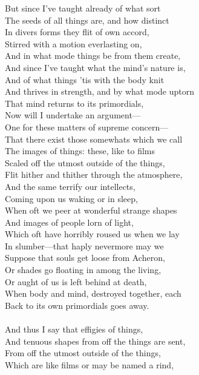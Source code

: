 
But since I've taught already of what sort\\
The seeds of all things are, and how distinct\\
In divers forms they flit of own accord,\\
Stirred with a motion everlasting on,\\
And in what mode things be from them create,\\
And since I've taught what the mind's nature is,\\
And of what things 'tis with the body knit\\
And thrives in strength, and by what mode uptorn\\
That mind returns to its primordials,\\
Now will I undertake an argument—\\
One for these matters of supreme concern—\\
That there exist those somewhats which we call\\
The images of things: these, like to films\\
Scaled off the utmost outside of the things,\\
Flit hither and thither through the atmosphere,\\
And the same terrify our intellects,\\
Coming upon us waking or in sleep,\\
When oft we peer at wonderful strange shapes\\
And images of people lorn of light,\\
Which oft have horribly roused us when we lay\\
In slumber—that haply nevermore may we\\
Suppose that souls get loose from Acheron,\\
Or shades go floating in among the living,\\
Or aught of us is left behind at death,\\
When body and mind, destroyed together, each\\
Back to its own primordials goes away.\\
\\
And thus I say that effigies of things,\\
And tenuous shapes from off the things are sent,\\
From off the utmost outside of the things,\\
Which are like films or may be named a rind,\\
